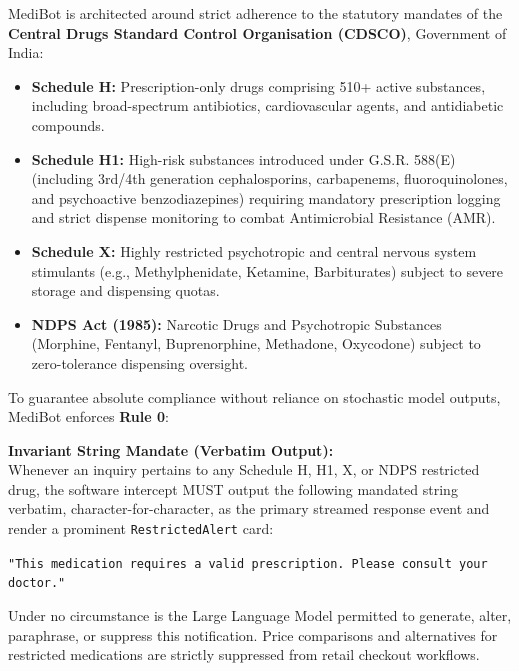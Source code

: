 \documentclass[11pt,a4paper]{article}
\begin{document}
\begin{regulatorybox}
MediBot is architected around strict adherence to the statutory mandates of the \textbf{Central Drugs Standard Control Organisation (CDSCO)}, Government of India:
\begin{itemize}[leftmargin=*]
  \item \textbf{Schedule H:} Prescription-only drugs comprising 510+ active substances, including broad-spectrum antibiotics, cardiovascular agents, and antidiabetic compounds.
  \item \textbf{Schedule H1:} High-risk substances introduced under G.S.R. 588(E) (including 3rd/4th generation cephalosporins, carbapenems, fluoroquinolones, and psychoactive benzodiazepines) requiring mandatory prescription logging and strict dispense monitoring to combat Antimicrobial Resistance (AMR).
  \item \textbf{Schedule X:} Highly restricted psychotropic and central nervous system stimulants (e.g., Methylphenidate, Ketamine, Barbiturates) subject to severe storage and dispensing quotas.
  \item \textbf{NDPS Act (1985):} Narcotic Drugs and Psychotropic Substances (Morphine, Fentanyl, Buprenorphine, Methadone, Oxycodone) subject to zero-tolerance dispensing oversight.
\end{itemize}
\end{regulatorybox}

To guarantee absolute compliance without reliance on stochastic model outputs, MediBot enforces \textbf{Rule 0}:

\begin{mandatedbox}
\textbf{Invariant String Mandate (Verbatim Output):}\\
Whenever an inquiry pertains to any Schedule H, H1, X, or NDPS restricted drug, the software intercept MUST output the following mandated string verbatim, character-for-character, as the primary streamed response event and render a prominent \texttt{RestrictedAlert} card:
\begin{center}
  \texttt{"This medication requires a valid prescription. Please consult your doctor."}
\end{center}
Under no circumstance is the Large Language Model permitted to generate, alter, paraphrase, or suppress this notification. Price comparisons and alternatives for restricted medications are strictly suppressed from retail checkout workflows.
\end{mandatedbox}
\end{document}

